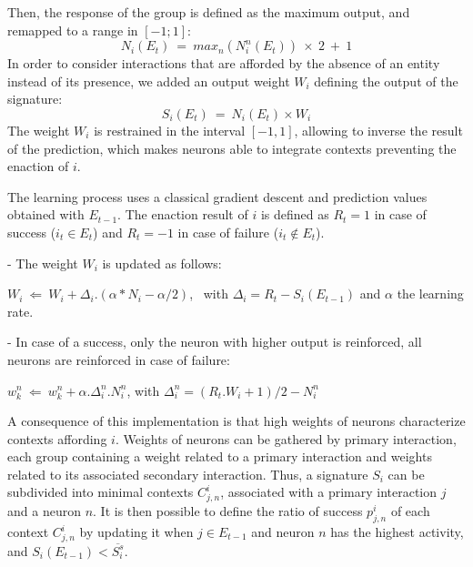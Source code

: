 \documentclass[conference]{IEEEtran}
\begin{document}
Then, the response of the group is defined as the maximum output, and remapped to a range in $[-1;1]$:
\begin{equation}
N_i(E_t)~=~max_n (N_i^n(E_t) ) \: \times \: 2 ~+~ 1
\end{equation}
In order to consider interactions that are afforded by the absence of an entity instead of its presence, we added an output weight $W_i$ defining the output of the signature:
\begin{equation}
S_i(E_t)~=~N_i(E_t) \times W_i
\end{equation}
The weight $W_i$ is restrained in the interval $[-1,1]$, allowing to inverse the result of the prediction, which makes neurons able to integrate contexts preventing the enaction of $i$.

The learning process uses a classical gradient descent and prediction values obtained with $E_{t-1}$.
The enaction result of $i$ is defined as $R_t=1$ in case of success ($i_t \in E_t$) and $R_t=-1$ in case of failure ($i_t \not\in E_t$).

- The weight $W_i$ is updated as follows:

$W_i ~\Leftarrow~ W_i+ \Delta_i . (\alpha * N_i - \alpha /2)$, ~with $\Delta_i=R_t-S_i(E_{t-1})$
and $\alpha$ the learning rate.

- In case of a success, only the neuron with higher output is reinforced, all neurons are reinforced in case of failure:

$w_k^n ~\Leftarrow~ w_k^n+ \alpha . \Delta_i^n . N_i^n$,
with $\Delta_i^n=(R_t.W_i + 1)/2 - N_i^n$


A consequence of this implementation is that high weights of neurons characterize contexts affording $i$.
Weights of neurons can be gathered by primary interaction, each group containing a weight related to a primary interaction and weights related to its associated secondary interaction. Thus, a signature $S_i$ can be subdivided into minimal contexts $C_{j,n}^i$, associated with a primary interaction $j$ and a neuron $n$. It is then possible to define the ratio of success $p_{j,n}^i$ of each context $C_{j,n}^i$ by updating it when $j \in E_{t-1}$ and neuron $n$ has the highest activity, and $S_i(E_{t-1})<\overline{S_i^s}$.
\end{document}
